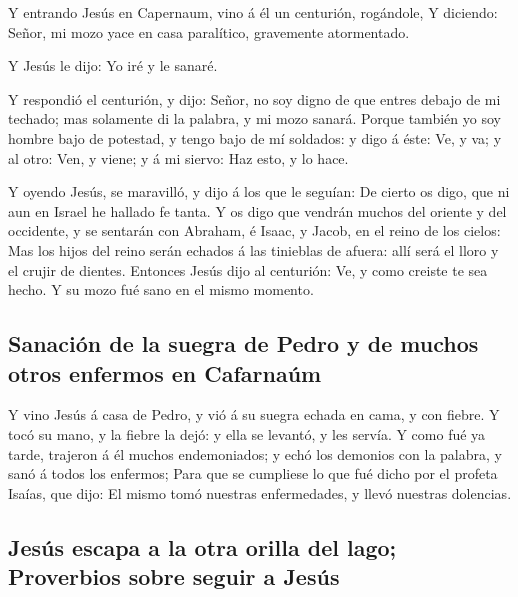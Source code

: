  Y entrando Jesús en Capernaum, vino á él un centurión,
rogándole,  Y diciendo: Señor, mi mozo yace en casa
paralítico, gravemente atormentado.

 Y Jesús le dijo: Yo iré y le sanaré.

 Y respondió el centurión, y dijo: Señor, no soy digno de
que entres debajo de mi techado; mas solamente di la palabra, y mi mozo
sanará.  Porque también yo soy hombre bajo de potestad, y
tengo bajo de mí soldados: y digo á éste: Ve, y va; y al otro: Ven, y
viene; y á mi siervo: Haz esto, y lo hace.

 Y oyendo Jesús, se maravilló, y dijo á los que le
seguían: De cierto os digo, que ni aun en Israel he hallado fe tanta.
 Y os digo que vendrán muchos del oriente y del
occidente, y se sentarán con Abraham, é Isaac, y Jacob, en el reino de
los cielos:  Mas los hijos del reino serán echados á las
tinieblas de afuera: allí será el lloro y el crujir de dientes.
 Entonces Jesús dijo al centurión: Ve, y como creiste te
sea hecho. Y su mozo fué sano en el mismo momento.

\hypertarget{sanaciuxf3n-de-la-suegra-de-pedro-y-de-muchos-otros-enfermos-en-cafarnauxfam}{%
\subsection{Sanación de la suegra de Pedro y de muchos otros enfermos en
Cafarnaúm}\label{sanaciuxf3n-de-la-suegra-de-pedro-y-de-muchos-otros-enfermos-en-cafarnauxfam}}

 Y vino Jesús á casa de Pedro, y vió á su suegra echada
en cama, y con fiebre.  Y tocó su mano, y la fiebre la
dejó: y ella se levantó, y les servía.  Y como fué ya
tarde, trajeron á él muchos endemoniados; y echó los demonios con la
palabra, y sanó á todos los enfermos;  Para que se
cumpliese lo que fué dicho por el profeta Isaías, que dijo: El mismo
tomó nuestras enfermedades, y llevó nuestras dolencias.

\hypertarget{jesuxfas-escapa-a-la-otra-orilla-del-lago-proverbios-sobre-seguir-a-jesuxfas}{%
\subsection{Jesús escapa a la otra orilla del lago; Proverbios sobre
seguir a
Jesús}\label{jesuxfas-escapa-a-la-otra-orilla-del-lago-proverbios-sobre-seguir-a-jesuxfas}}

